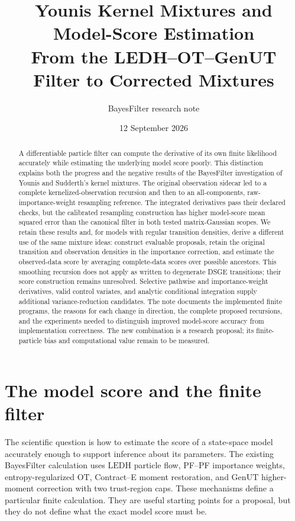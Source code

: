 \documentclass[11pt]{article}
\title{Younis Kernel Mixtures and Model-Score Estimation\\
From the LEDH--OT--GenUT Filter to Corrected Mixtures}
\author{BayesFilter research note}
\date{12 September 2026}
\newcommand{\LEDH}{\ensuremath{\mathrm{LEDH}}}
\newcommand{\GenUT}{\ensuremath{\mathrm{GenUT}}}
\newcommand{\OT}{\ensuremath{\mathrm{OT}}}
\begin{document}
\maketitle

\begin{abstract}
A differentiable particle filter can compute the derivative of its own
finite likelihood accurately while estimating the underlying model score
poorly. This distinction explains both the progress and the negative results
of the BayesFilter investigation of Younis and Sudderth's kernel mixtures.
The original observation sidecar led to a complete kernelized-observation
recursion and then to an all-components, raw-importance-weight resampling
reference. The integrated derivatives pass their declared checks, but the
calibrated resampling construction has higher model-score mean squared error
than the canonical filter in both tested matrix-Gaussian scopes. We retain
these results and, for models with regular transition densities, derive a
different use of the same mixture ideas: construct evaluable proposals,
retain the original transition and observation densities in the importance
correction, and estimate the observed-data score by averaging complete-data
scores over possible ancestors. This smoothing recursion does not apply as
written to degenerate DSGE transitions; their score construction remains
unresolved. Selective pathwise
and importance-weight derivatives, valid control variates, and analytic
conditional integration supply additional variance-reduction candidates.
The note documents the implemented finite programs, the reasons for each
change in direction, the complete proposed recursions, and the experiments
needed to distinguish improved model-score accuracy from implementation
correctness. The new combination is a research proposal; its finite-particle
bias and computational value remain to be measured.
\end{abstract}
\clearpage
\tableofcontents
\clearpage

\section{The model score and the finite filter}
\label{sec:question}

The scientific question is how to estimate the score of a state-space model
accurately enough to support inference about its parameters. The existing
BayesFilter calculation uses \LEDH{} particle flow, PF--PF importance weights,
entropy-regularized \OT{}, Contract--E moment restoration, and \GenUT{}
higher-moment correction with two trust-region caps. These mechanisms define
a particular finite calculation. They are useful starting points for a
proposal, but they do not define what the exact model score must be.
\end{document}
